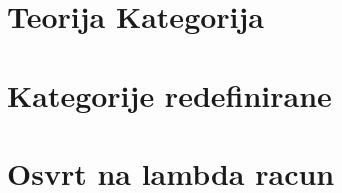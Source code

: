 \documentclass[ a4paper, 12pt]{report}
\theoremstyle{definition}
\numberwithin{Primjer}{chapter}
\begin{document}
%


%
%
\newpage
{} \setcounter{page}{1}
\tableofcontents
%
%

%
 \setcounter{page}{1}
%
%
\chapter{Teorija Kategorija}
%


\chapter{Kategorije redefinirane}
%


\chapter{Osvrt na lambda racun}
%

\end{document}
